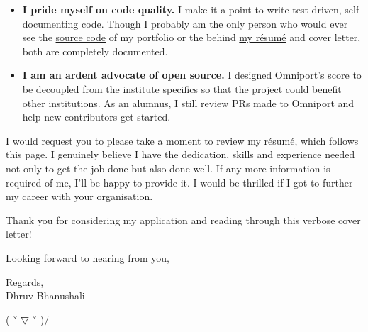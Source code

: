 \begin{itemize}[nosep, parsep = 1mm, leftmargin = *]
  \item \textbf{I pride myself on code quality.} I make it a point to write
  test-driven, self-documenting code. Though I probably am the only person who
  would ever see the 
  \href{https://github.com/dhruvkb/portfolio/}{source code}
  of my portfolio or the \prettylatex behind
  \href{https://github.com/dhruvkb/resume/}{my résumé}
  and cover letter, both are completely documented.

  \item \textbf{I am an ardent advocate of open source.} I designed Omniport's
  score to be decoupled from the institute specifics so that the project could
  benefit other institutions. As an alumnus, I still review PRs made to Omniport
  and help new contributors get started.
\end{itemize}

I would request you to please take a moment to review my résumé, which follows
this page. I genuinely believe I have the dedication, skills and experience
needed not only to get the job done but also done well. If any more information
is required of me, I'll be happy to provide it. I would be thrilled if I got to
further my career with your organisation.

Thank you for considering my application and reading through this verbose cover
letter!

Looking forward to hearing from you,

Regards,\\
Dhruv Bhanushali
\setlength{\parskip}{0mm} %

\vfill
\textcolor{secondary}{( ˇ ▽ ˇ )/}
\pagebreak